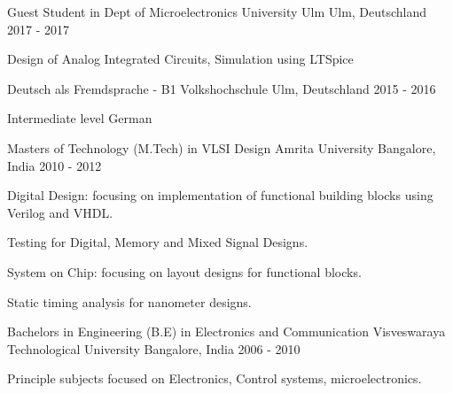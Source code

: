 

\begin{cventries}

  \cventry
    {Guest Student in Dept of Microelectronics} %
    {University Ulm} %
    {Ulm, Deutschland} %
    {2017 - 2017} %
    {
      \begin{cvitems} %
	\item {Design of Analog Integrated Circuits, Simulation using LTSpice}
      \end{cvitems}
    }

  \cventry
    {Deutsch als Fremdsprache - B1} %
    {Volkshochschule} %
    {Ulm, Deutschland} %
    {2015 - 2016} %
    {
      \begin{cvitems} %
	\item {Intermediate level German}
      \end{cvitems}
    }


  \cventry
    {Masters of Technology (M.Tech) in VLSI Design} %
    {Amrita University} %
    {Bangalore, India} %
    {2010 - 2012} %
    {
      \begin{cvitems} %
        \item {Digital Design: focusing on implementation of functional building blocks using Verilog and VHDL.}
        \item {Testing for Digital, Memory and Mixed Signal Designs.}
        \item {System on Chip: focusing on layout designs for functional blocks.}
        \item {Static timing analysis for nanometer designs.}
      \end{cvitems}
    }


  \cventry
    {Bachelors in Engineering (B.E) in Electronics and Communication} %
    {Visveswaraya Technological University} %
    {Bangalore, India} %
    {2006 - 2010} %
    {
      \begin{cvitems} %
      \item {Principle subjects focused on Electronics, Control systems, microelectronics.}
      \end{cvitems}
    }

\end{cventries}
